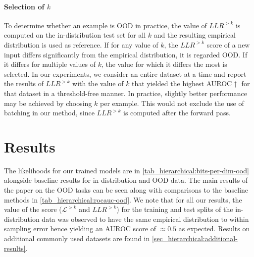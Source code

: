{%
\paragraph{Selection of $k$} To determine whether an example is OOD in practice, the value of $LLR^{>k}$ is computed on the in-distribution test set for all $k$ and the resulting empirical distribution is used as reference.
If for any value of $k$, the $LLR^{>k}$ score of a new input differs significantly from the empirical distribution, it is regarded OOD.
If it differs for multiple values of $k$, the value for which it differs the most is selected.
In our experiments, we consider an entire dataset at a time and report the results of $LLR^{>k}$ with the value of $k$ that yielded the highest AUROC$\uparrow$ for that dataset in a threshold-free manner.
In practice, slightly better performance may be achieved by choosing $k$ per example.
This would not exclude the use of batching in our method, since $LLR^{>k}$ is computed after the forward pass.


\section{Results}

The likelihoods for our trained models are in \cref{tab_hierarchical:bits-per-dim-ood} alongside baseline results for in-distribution and OOD data.
The main results of the paper on the OOD tasks can be seen along with comparisons to the baseline methods in \cref{tab_hierarchical:rocauc-ood}.
We note that for all our results, the value of the score ($\mathcal{L}^{>k}$ and $LLR^{>k}$) for the training and test splits of the in-distribution data was observed to have the same empirical distribution to within sampling error hence yielding an AUROC score of $\approx0.5$ as expected.
Results on additional commonly used datasets are found in \cref{sec_hierarchical:additional-results}.


}
